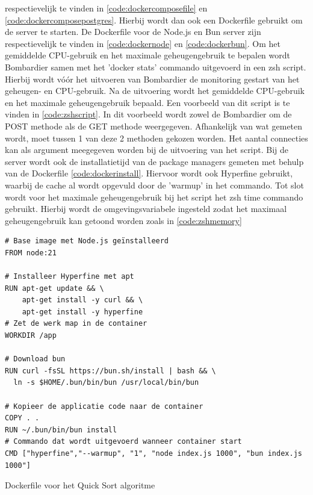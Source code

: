 respectievelijk te vinden in \ref{code:dockercomposefile} en \ref{code:dockercomposepostgres}.
Hierbij wordt dan ook een Dockerfile gebruikt om de server te starten. De Dockerfile voor de Node.js en Bun server 
zijn respectievelijk te vinden in \ref{code:dockernode} en \ref{code:dockerbun}. 
Om het gemiddelde CPU-gebruik en het maximale geheugengebruik te bepalen wordt Bombardier samen met het 'docker stats' commando uitgevoerd in een zsh script.
Hierbij wordt vóór het uitvoeren van Bombardier de monitoring gestart van het geheugen- en CPU-gebruik. 
Na de uitvoering wordt het gemiddelde CPU-gebruik en het maximale geheugengebruik bepaald.
Een voorbeeld van dit script is te vinden in \ref{code:zshscript}. 
In dit voorbeeld wordt zowel de Bombardier om de POST methode als de GET methode weergegeven. Afhankelijk van wat gemeten wordt, moet tussen 1 van deze 2 methoden gekozen worden.
Het aantal connecties kan als argument meegegeven worden bij de uitvoering van het script.
Bij de server wordt ook de installatietijd van de package managers gemeten met behulp van de Dockerfile \ref{code:dockerinstall}.
Hiervoor wordt ook Hyperfine gebruikt, waarbij de cache al wordt opgevuld door de 'warmup' in het commando.
Tot slot wordt voor het maximale geheugengebruik bij het script het zsh time commando gebruikt. Hierbij wordt de omgevingsvariabele 
ingesteld zodat het maximaal geheugengebruik kan getoond worden zoals in \ref{code:zshmemory}
\begin{listing}[H]
  \centering
  \begin{verbatim}
# Base image met Node.js geïnstalleerd
FROM node:21

# Installeer Hyperfine met apt
RUN apt-get update && \
    apt-get install -y curl && \
    apt-get install -y hyperfine
# Zet de werk map in de container
WORKDIR /app

# Download bun
RUN curl -fsSL https://bun.sh/install | bash && \
  ln -s $HOME/.bun/bin/bun /usr/local/bin/bun

# Kopieer de applicatie code naar de container
COPY . .
RUN ~/.bun/bin/bun install
# Commando dat wordt uitgevoerd wanneer container start
CMD ["hyperfine","--warmup", "1", "node index.js 1000", "bun index.js 1000"]
      \end{verbatim}
      \caption{\label{code:dockerscript}Dockerfile voor het Quick Sort algoritme}
\end{listing}

